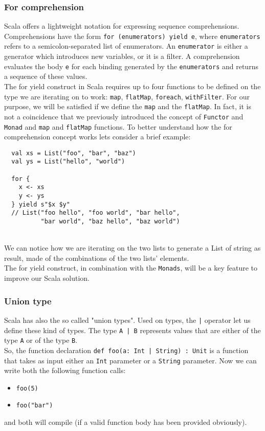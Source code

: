       

\subsubsection{For comprehension}
Scala offers a lightweight notation for expressing \gls{sequence comprehension}s.
Comprehensions have the form \texttt{for (enumerators) yield e}, where \texttt{enumerators} refers to a semicolon-separated list of enumerators.
An \texttt{enumerator} is either a generator which introduces new variables, or it is a filter.
A comprehension evaluates the body \texttt{e} for each binding generated by the \texttt{enumerators} and returns a sequence of these values.\\
The for yield construct in Scala requires up to four functions to be defined on the type we are iterating on to work: \texttt{map}, \texttt{flatMap}, \texttt{foreach}, \texttt{withFilter}.
For our purpose, we will be satisfied if we define the \texttt{map} and the \texttt{flatMap}.
In fact, it is not a coincidence that we previously introduced the concept of \texttt{Functor} and \texttt{Monad} and \texttt{map} and \texttt{flatMap} functions.
To better understand how the for comprehension concept works lets consider a brief example:
\begin{verbatim}
  val xs = List("foo", "bar", "baz")
  val ys = List("hello", "world")

  for {
    x <- xs
    y <- ys
  } yield s"$x $y"
  // List("foo hello", "foo world", "bar hello", 
          "bar world", "baz hello", "baz world")
\end{verbatim}\mbox{}\\
We can notice how we are iterating on the two lists to generate a List of string as result, made of the combinations of the two lists' elements.\\
The for yield construct, in combination with the \texttt{Monads}, will be a key feature to improve our Scala solution.

\subsubsection{Union type}
\label{sssec:union}
Scala has also the so called "union types".
Used on types, the \texttt{|} operator let us define these kind of types. The type \texttt{A | B} represents values that are either of the type \texttt{A} or of the type \texttt{B}.\\
So, the function declaration \texttt{def foo(a: Int | String)  : Unit} is a function that takes as input either an \texttt{Int} parameter or a \texttt{String} parameter.
Now we can write both the following function calls:
\begin{itemize}
  \item \texttt{foo(5)}
  \item \texttt{foo("bar")}
\end{itemize}
and both will compile (if a valid function body has been provided obviously).


